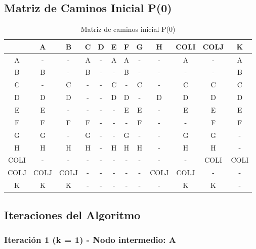 \documentclass[12pt]{article}
\begin{document}
\subsection{Matriz de Caminos Inicial P(0)}
\begin{table}[h!]
\centering
\begin{tabular}{|c|c|c|c|c|c|c|c|c|c|c|c|}
\hline
 & A & B & C & D & E & F & G & H & COLI & COLJ & K \\\hline
A & - & - & A & - & A & A & - & - & A & - & A \\\hline
B & B & - & B & - & - & B & - & - & - & - & B \\\hline
C & - & C & - & - & C & - & C & - & C & C & C \\\hline
D & D & D & - & - & D & D & - & D & D & D & D \\\hline
E & E & - & - & - & - & E & E & - & E & E & E \\\hline
F & F & F & F & - & - & - & F & - & - & F & F \\\hline
G & G & - & G & - & - & G & - & - & G & G & - \\\hline
H & H & H & H & - & H & H & H & - & H & H & - \\\hline
COLI & - & - & - & - & - & - & - & - & - & COLI & COLI \\\hline
COLJ & COLJ & COLJ & - & - & - & - & - & COLJ & COLJ & - & - \\\hline
K & K & K & - & - & - & - & - & - & K & K & - \\\hline
\end{tabular}
\caption{Matriz de caminos inicial P(0)}
\end{table}

\clearpage
\subsection{Iteraciones del Algoritmo}
\subsubsection{Iteración 1 (k = 1) - Nodo intermedio: A}
\end{document}
